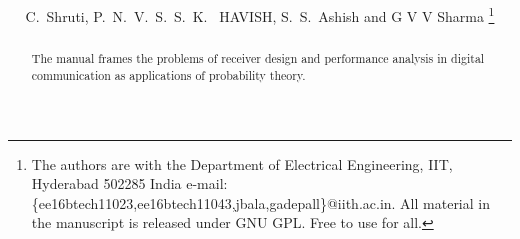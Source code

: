 \documentclass[journal,12pt,twocolumn]{IEEEtran}
\begin{document}
\title{
}
%
%
%

\author{C.~Shruti, P.~N.~V.~S.~S.~K.~ HAVISH, S.~S.~Ashish and G V V Sharma %
\thanks{The authors are with the Department
of Electrical Engineering, IIT, Hyderabad
502285 India e-mail: \{ee16btech11023,ee16btech11043,jbala,gadepall\}@iith.ac.in. All material in the manuscript is released under GNU GPL.  Free to use for all.
}}



\maketitle

\tableofcontents

\bigskip

\begin{abstract}
The manual frames the problems of receiver design and performance analysis in digital communication as applications of probability theory.

\end{abstract}




%
\IEEEpeerreviewmaketitle
\end{document}
